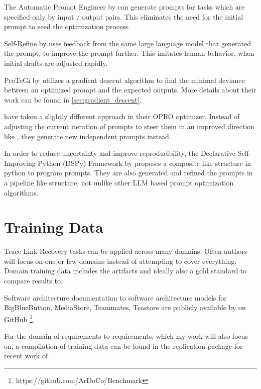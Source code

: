 The Automatic Promot Engineer by  can generate prompts for tasks which are specified only by input / output pairs. This eliminates the need for the initial prompt to seed the optimization process.

Self-Refine by  uses feedback from the same large language model that generated the prompt, to improve the prompt further. This imitates human behavior, when initial drafts are adjusted rapidly. 

ProTeGi by  utilizes a gradient descent algorithm to find the minimal deviance between an optimized prompt and the expected outputs. More details about their work can be found in \ref{sec:gradient_descent}.

 have taken a slightly different approach in their OPRO optimizer. Instead of adjusting the current iteration of prompts to steer them in an improved direction like \citeauthor{pryzant2023AutomaticPrompt}, they generate new independent prompts instead.

In order to reduce uncertainty and improve reproducibility, the Declarative Self-Improving Python (DSPy) Framework by  proposes a composite like structure in python to program prompts. They are also generated and refined the prompts in a pipeline like structure, not unlike other LLM based prompt optimization algorithms. 

\section{Training Data}
Trace Link Recovery tasks can be applied across many domains. Often authors will focus on one or few domains instead of attempting to cover everything. Domain training data includes the artifacts and ideally also a gold standard to compare results to.

Software architecture documentation to software architecture models for BigBlueButton, MediaStore, Teammates, Teastore are publicly available by  on GitHub \footnote{https://github.com/ArDoCo/Benchmark}.

For the domain of requirements to requirements, which my work will also focus on, a compilation of training data can be found in the replication package\cite{hey2025ReplicationPackage} for recent work of \citeauthor{hey2025RequirementsTraceability}.